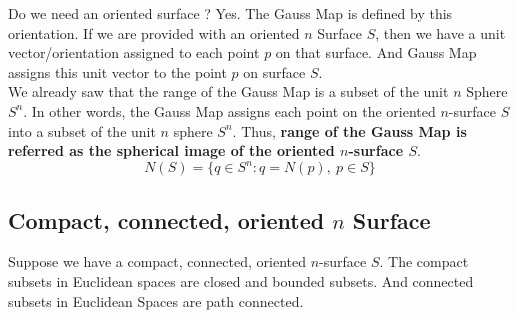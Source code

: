 	Do we need an oriented surface ? Yes.
	The Gauss Map is defined by this orientation.
	If we are provided with an oriented $n$ Surface $S$, then we have a unit vector/orientation assigned to each point $p$ on that surface.
	And Gauss Map assigns this unit vector to the point $p$ on surface $S$.\\

	We already saw that the range of the Gauss Map is a subset of the unit $n$ Sphere $S^n$.
	In other words, the Gauss Map assigns each point on the oriented $n$-surface $S$ into a subset of the unit $n$ sphere $S^n$.
	Thus, \textbf{range of the Gauss Map is referred as the spherical image of the oriented $n$-surface $S$}.
	\begin{equation}
	N(S) = \{ q \in S^n : q = N(p),\ p \in S \}
	\end{equation}

\subsection{Compact, connected, oriented $n$ Surface}
	Suppose we have a compact, connected, oriented $n$-surface $S$.
	The compact subsets in Euclidean spaces are closed and bounded subsets.
	And connected subsets in Euclidean Spaces are path connected.\\

